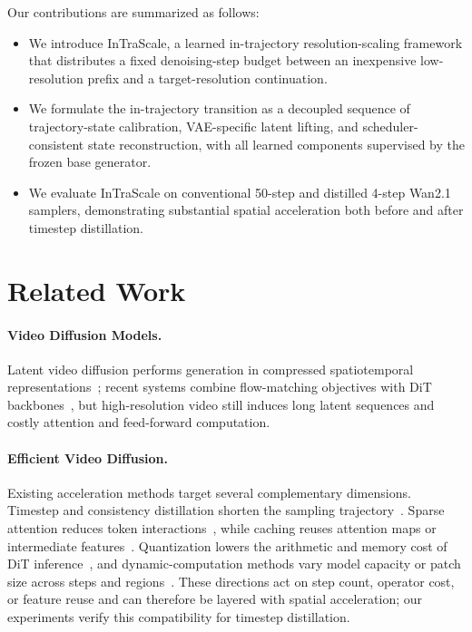 \documentclass[letterpaper]{article} %
\begin{document}
Our contributions are summarized as follows:
\begin{itemize}
  \item We introduce InTraScale, a learned in-trajectory resolution-scaling
  framework that distributes a fixed denoising-step budget between an
  inexpensive low-resolution prefix and a target-resolution continuation.

  \item We formulate the in-trajectory transition as a decoupled
sequence of trajectory-state calibration, VAE-specific latent lifting,
and scheduler-consistent state reconstruction, with all learned
components supervised by the frozen base generator.

  \item We evaluate InTraScale on conventional 50-step and distilled
  4-step Wan2.1 samplers, demonstrating substantial spatial
  acceleration both before and after timestep distillation.
\end{itemize}

\section{Related Work}

\paragraph{Video Diffusion Models.}
Latent video diffusion performs generation in compressed spatiotemporal
representations~\citep{blattmann2023videoldm}; recent systems combine
flow-matching objectives with DiT backbones~\citep{jin2025pyramidalflow,wan2025},
but high-resolution video still induces long latent sequences and costly
attention and feed-forward computation.

\paragraph{Efficient Video Diffusion.}
Existing acceleration methods target several complementary dimensions.
Timestep and consistency distillation shorten the sampling
trajectory~\citep{wang2023videolcm,li2024t2vturbo,ding2025dollar,nie2026tmd}.
Sparse attention reduces token interactions~\citep{xi2025sparsevideogen},
while caching reuses attention maps or intermediate
features~\citep{zhao2025pab,liu2025teacache,zou2026disca}. Quantization lowers
the arithmetic and memory cost of DiT inference~\citep{zhao2025viditq}, and
dynamic-computation methods vary model capacity or patch size across steps and
regions~\citep{anagnostidis2025flexidit,kim2026ddit,li2026dynapatch}. These
directions act on step count, operator cost, or feature reuse and can therefore
be layered with spatial acceleration; our experiments verify this
compatibility for timestep distillation.
\end{document}
